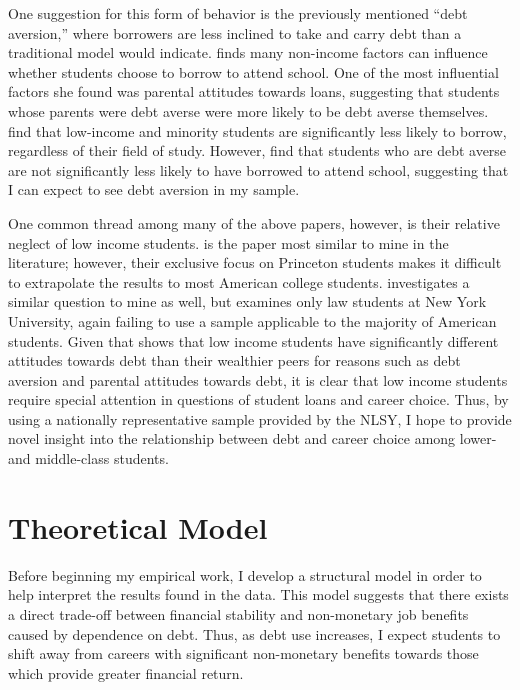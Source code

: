 \documentclass[12pt]{article}
\begin{document}
	One suggestion for this form of behavior is the previously mentioned ``debt aversion,'' where borrowers are less inclined to take and carry debt than a traditional model would indicate. \textcite{burdman2005} finds many non-income factors can influence whether students choose to borrow to attend school. One of the most influential factors she found was parental attitudes towards loans, suggesting that students whose parents were debt averse were more likely to be debt averse themselves. \textcite{callender2005} find that low-income and minority students are significantly less likely to borrow, regardless of their field of study. However, \textcite{eckel2007} find that students who are debt averse are not significantly less likely to have borrowed to attend school, suggesting that I can expect to see debt aversion in my sample. 
	
	One common thread among many of the above papers, however, is their relative neglect of low income students. \textcite{rothstein2011} is the paper most similar to mine in the literature; however, their exclusive focus on Princeton students makes it difficult to extrapolate the results to most American college students. \textcite{field2009} investigates a similar question to mine as well, but examines only law students at New York University, again failing to use a sample applicable to the majority of American students. Given that \textcite{callender2005} shows that low income students have significantly different attitudes towards debt than their wealthier peers for reasons such as debt aversion and parental attitudes towards debt, it is clear that low income students require special attention in questions of student loans and career choice. Thus, by using a nationally representative sample provided by the NLSY, I hope to provide novel insight into the relationship between debt and career choice among lower- and middle-class students.

	\section{Theoretical Model}
	
	Before beginning my empirical work, I develop a structural model in order to help interpret the results found in the data. This model suggests that there exists a direct trade-off between financial stability and non-monetary job benefits caused by dependence on debt. Thus, as debt use increases, I expect students to shift away from careers with significant non-monetary benefits towards those which provide greater financial return.
\end{document}
